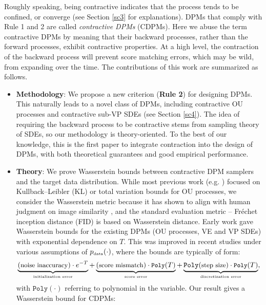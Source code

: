 \documentclass[letterpaper,11pt,reqno]{amsart}
\numberwithin{equation}{section}
\begin{document}
Roughly speaking, being contractive indicates that
the process tends to be confined, or converge (see Section \ref{sc3} for explanations).
DPMs that comply with Rule 1 and 2
are called {\em contractive DPMs} (CDPMs).
Here we abuse the term contractive DPMs by meaning that 
their backward processes, rather than the forward processes, 
exhibit contractive properties.
At a high level, 
the contraction of the backward process will prevent score matching errors,
which may be wild, from expanding over the time.
The contributions of this work are summarized as follows.
\begin{itemize}[itemsep = 3 pt]
\item
{\bf Methodology}:
We propose a new criterion ({\bf Rule 2}) for designing DPMs.
This naturally leads to a novel class of DPMs,
including contractive OU processes and contractive sub-VP SDEs (see Section \ref{sc4}).
The idea of requiring the backward process to be contractive
stems from sampling theory of SDEs,
so our methodology is theory-oriented. 
To the best of our knowledge, 
this is the first paper to integrate contraction into the design of DPMs,
with both theoretical guarantees
and good empirical performance.
\item
{\bf Theory}:
We prove Wasserstein bounds between contractive DPM samplers
and the target data distribution.
While most previous work (e.g. \cite{Chen23, DV21, LLT22}) 
focused on Kullback–Leibler (KL) or total variation bounds for OU processes,
we consider the Wasserstein metric because  
it has shown to align with human judgment on image similarity \cite{Bor19}, and the standard evaluation metric -- Fr\'echet inception distance (FID) is based on Wasserstein distance.
Early work \cite{DV21, KW22} gave Wasserstein bounds for the existing DPMs (OU processes, VE and VP SDEs)
with exponential dependence on $T$.
This was improved in recent studies \cite{Chen23, LLT23, GNZ23}
under various assumptions of $p_{\tiny \mbox{data}}(\cdot)$, 
where the bounds are typically of form:
\begin{equation*}
\underbrace{(\small \mbox{noise inaccuracy}) \cdot e^{-T}}_{\tiny \mbox{initialization error}} + \underbrace{(\small \mbox{score mismatch}) \cdot \texttt{Poly}(T)}_{\tiny \mbox{score error}}
+ \underbrace{\texttt{Poly}(\small \mbox{step size}) \cdot \texttt{Poly}(T)}_{\tiny \mbox{discretization error}},
\end{equation*}
with $\texttt{Poly}(\cdot)$ referring to polynomial in the variable. 
Our result gives a Wasserstein bound for CDPMs:
\begin{equation*}

\end{equation*}
\end{itemize}
\end{document}
